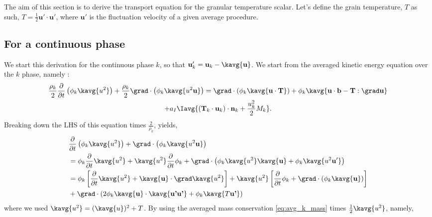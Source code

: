 The aim of this section is to derive the transport equation for the granular temperature scalar. 
Let's define the grain temperature, $T$ as such, $T =\frac{1}{2} \textbf{u}'\cdot\textbf{u}'$, where $\textbf{u}'$ is the fluctuation velocity of a given average procedure. 

\subsection{For a continuous phase}
We start this derivation for the continuous phase $k$, so that $\textbf{u}'_k = \textbf{u}_k - \kavg{\textbf{u}}$.
We start from the averaged kinetic energy equation over the $k$ phase, namely : 
\begin{multline*}
    \frac{\rho_k}{2}\frac{\partial }{\partial t}\left(
        \phi_k
        \kavg{u^2}
    \right)
    +\frac{\rho_k}{2}\grad\cdot \left(
        \phi_k
        \kavg{u^2\textbf{u}}
    \right)
    =
    \grad\cdot\left(
        \phi_k
        \kavg{\textbf{u}\cdot \textbf{T}}
    \right)
    +\phi_k\kavg{\textbf{u}\cdot\textbf{b} - \textbf{T}: \grad\textbf{u}}\\
    +a_I \Iavg{
        (\textbf{T}_k\cdot\textbf{u}_k)\cdot\textbf{n}_k
        + \frac{u^2_k}{2} M_k}.
\end{multline*}
Breaking down the LHS of this equation times $\frac{2}{\rho_k}$, yields,
\begin{align*}
    &\frac{\partial }{\partial t}\left(
        \phi_k
        \kavg{u^2}
    \right)
    +
    \grad\cdot \left(
        \phi_k
        \kavg{u^2\textbf{u}}
    \right)\\
    &=
    \phi_k\frac{\partial }{\partial t}\kavg{u^2}
    +\kavg{u^2}\frac{\partial }{\partial t}\phi_k
    +\grad\cdot \left(
        \phi_k
        \kavg{u^2}\kavg{\textbf{u}}
        +\phi_k
        \kavg{u^2\textbf{u}'}
    \right)\\
    &=
    \phi_k
    \left[
        \frac{\partial }{\partial t}\kavg{u^2}
        + 
        \kavg{\textbf{u}}
        \cdot\grad 
        \kavg{u^2}
    \right]
    +\kavg{u^2} \left[
        \frac{\partial }{\partial t}\phi_k
        + \grad\cdot \left(
            \phi_k
            \kavg{\textbf{u}}
        \right)
    \right]\\
    &+ \grad\cdot \left(
        2\phi_k
        \kavg{\textbf{u}}\cdot\kavg{\textbf{u'}\textbf{u'}} + \phi_k \kavg{T \textbf{u'}}
    \right)
\end{align*}
where we used $\kavg{u^2} = (\kavg{u})^2 + T$. 
By using the averaged mass conservation \ref{eq:avg_k_mass} times $\frac{1}{2}\kavg{u^2}$, namely, 
